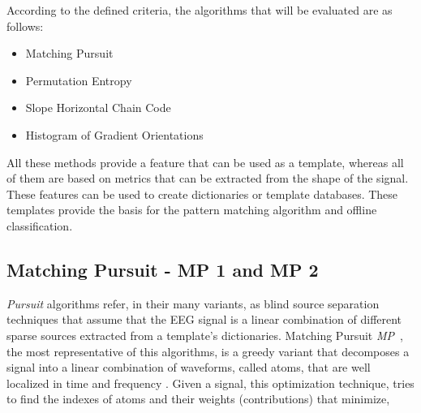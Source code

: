 \documentclass[brainsci,article,submit,moreauthors,pdftex,10pt,a4paper]{mdpi}
\begin{document}

%
%
%
%
%
%
%
%
%
%

According to the defined criteria, the algorithms that will be evaluated are as follows:

\begin{itemize}
\item Matching Pursuit
\item Permutation Entropy
\item Slope Horizontal Chain Code
\item Histogram of Gradient Orientations
\end{itemize}

All these methods provide a feature that can be used as a template, whereas all of them are based on metrics that can be extracted from the shape of the signal.  These features can be used to create dictionaries or template databases.  These templates provide the basis for the pattern matching algorithm and offline classification.

\subsection{Matching Pursuit - MP 1 and MP 2}

\textit{Pursuit} algorithms refer, in their many variants, as blind source separation \citep{Vincent2010} techniques that assume that the EEG signal is a linear combination of different sparse sources extracted from a template's dictionaries.  Matching Pursuit \textit{MP}~\citep{Mallat1993}, the most representative of this algorithms, is a greedy variant that decomposes a signal into a linear combination of waveforms, called atoms, that are well localized in time and frequency \citep{ChandranKS2016}.  Given a signal, this optimization technique, tries to find the indexes of atoms and their weights (contributions) that minimize,
\end{document}
